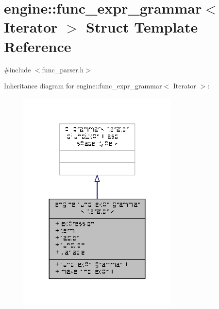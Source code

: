 \hypertarget{structengine_1_1func__expr__grammar}{\section{engine\-:\-:func\-\_\-expr\-\_\-grammar$<$ Iterator $>$ Struct Template Reference}
\label{structengine_1_1func__expr__grammar}
}


{\ttfamily \#include $<$func\-\_\-parser.\-h$>$}



Inheritance diagram for engine\-:\-:func\-\_\-expr\-\_\-grammar$<$ Iterator $>$\-:
\nopagebreak
\begin{figure}[H]
\begin{center}
\leavevmode
\includegraphics[width=228pt]{structengine_1_1func__expr__grammar__inherit__graph}
\end{center}
\end{figure}


